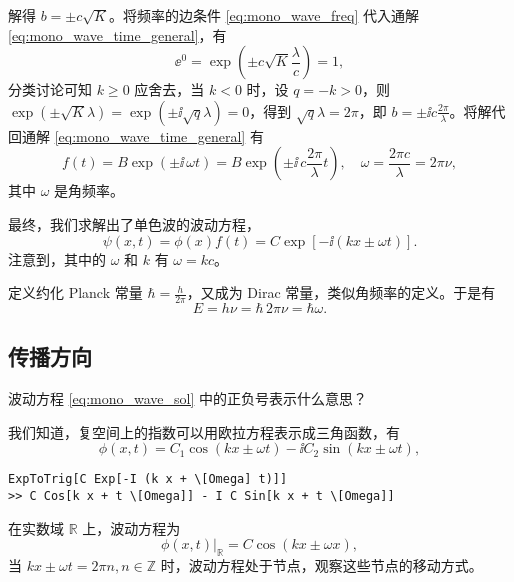 解得 $b = \pm c\sqrt{K}$。将频率的边条件 \eqref{eq:mono_wave_freq} 代入通解 \eqref{eq:mono_wave_time_general}，有
\begin{equation}
    \ee^0 = \exp \left(\pm c \sqrt K \frac\lambda{c}\right) = 1,
\end{equation}
分类讨论可知 $ k \geqslant 0$ 应舍去，当 $k<0$ 时，设 $q = -k>0$，则 $\exp(\pm \sqrt K \lambda) = \exp(\pm \ii\sqrt q \lambda) = 0$，得到 $\sqrt q \lambda = 2\pi$，即 $b = \pm \ii c \frac{2\pi}\lambda$。将解代回通解 \eqref{eq:mono_wave_time_general} 有
\begin{equation}
    f(t) = B \exp\left(\pm\ii \,\omega t\right) = B \exp \left(\pm \ii \,c \frac{2\pi}\lambda t\right),\quad \omega = \frac{2\pi c}{\lambda} = 2\pi \nu,
\end{equation}
其中 $\omega$ 是角频率。

最终，我们求解出了单色波的波动方程，
\begin{equation}
    \psi(x,t) = \phi(x) f(t) = C \exp[-\ii(k x \pm \omega t)]. \label{eq:mono_wave_sol}
\end{equation}
注意到，其中的 $\omega$ 和 $k$ 有 $\omega = k c$。

定义约化 Planck 常量 $\hbar = \frac{h}{2\pi}$，又成为 Dirac 常量，类似角频率的定义。于是有
\begin{equation}
    E = h\nu = \hbar \, 2\pi \nu = \hbar \omega. 
\end{equation}
\subsection{传播方向}
波动方程 \eqref{eq:mono_wave_sol} 中的正负号表示什么意思？

我们知道，复空间上的指数可以用欧拉方程表示成三角函数，有
\begin{equation}
    \phi(x,t) = C_1 \cos (k x\pm \omega t)-\ii C_2 \sin (k x \pm \omega t),
\end{equation}
\begin{lstlisting}
ExpToTrig[C Exp[-I (k x + \[Omega] t)]]
>> C Cos[k x + t \[Omega]] - I C Sin[k x + t \[Omega]]
\end{lstlisting}
在实数域 $\mathbb{R}$ 上，波动方程为
\begin{equation}
    \phi(x,t)|_\mathbb{R} = C \cos(k x\pm \omega x),
\end{equation}
当 $kx\pm\omega t=2\pi n, n \in \mathbb{Z}$ 时，波动方程处于节点，观察这些节点的移动方式。

